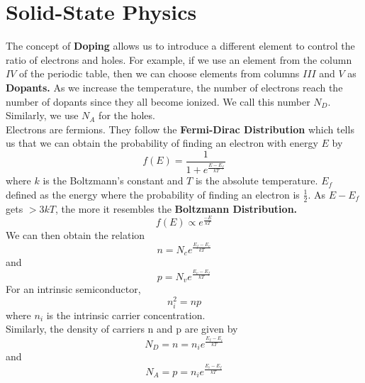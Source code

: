 \documentclass{article}
\begin{document}
\section{Solid-State Physics}
\noindent 
The concept of \textbf{Doping} allows us to introduce a different element to control 
the ratio of electrons and holes. For example, if we use an element from the column
$IV$ of the periodic table, then we can choose elements from columns $III$ and $V$ as
\textbf{Dopants.} As we increase the temperature, the number of electrons reach the 
number of dopants since they all become ionized. We call this number $N_D$. Similarly,
we use $N_A$ for the holes. 
\vspace{8pt}
\\ Electrons are fermions. They follow the \textbf{Fermi-Dirac Distribution} which 
tells us that we can obtain the probability of finding an electron with energy $E$ by
$$f(E) = \frac{1}{1+e^{\frac{E-E_{f}}{kT}}}$$ where $k$ is the Boltzmann's constant
and $T$ is the absolute temperature. $E_{f}$ defined as the energy where the probability
of finding an electron is $\frac{1}{2}$. As $E-E_{f}$ gets $>3kT$, the more it 
resembles the \textbf{Boltzmann Distribution.} $$f(E) \propto{e^\frac{-E}{kT}}$$
We can then obtain the relation $$n = N_{c} e^\frac{E_f - E_c}{kT}$$ and 
$$p = N_{v} e^\frac{E_v - E_f}{kT}$$ 
For an intrinsic semiconductor, $$\boxed{n_{i}^2 = np}$$ where $n_i$ is the intrinsic
carrier concentration. 
\vspace{8pt}
\\
Similarly, the density of carriers n and p are given by 
$$\boxed{N_D = n = n_{i}e^{\frac{E_f -E_i}{kT}}}$$
and 
$$\boxed{N_A = p = n_{i}e^{\frac{E_i -E_f}{kT}}}$$

\newpage 
\end{document}

